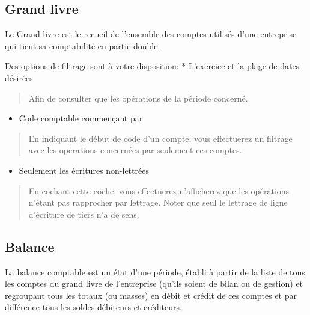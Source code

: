 \documentclass[a4paper,10pt,oneside,french]{sphinxmanual}
\begin{document}
\subsection{Grand livre}
\label{\detokenize{accounting/reporting:grand-livre}}
Le Grand livre est le recueil de l’ensemble des comptes utilisés d’une entreprise qui tient sa comptabilité en partie double.

Des options de filtrage sont à votre disposition:
* L’exercice et la plage de dates désirées
\begin{quote}

Afin de consulter que les opérations de la période concerné.
\end{quote}
\begin{itemize}
\item {} 
Code comptable commençant par

\end{itemize}
\begin{quote}

En indiquant le début de code d’un compte, vous effectuerez un filtrage avec les opérations concernées par seulement ces comptes.
\end{quote}
\begin{itemize}
\item {} 
Seulement les écritures non-lettrées

\end{itemize}
\begin{quote}

En cochant cette coche, vous effectuerez n’afficherez que les opérations n’étant pas rapprocher par lettrage.
Noter que seul le lettrage de ligne d’écriture de tiers n’a de sens.
\end{quote}


\subsection{Balance}
\label{\detokenize{accounting/reporting:balance}}
La balance comptable est un état d’une période, établi à partir de la liste de tous les comptes du grand livre de l’entreprise (qu’ils soient de bilan ou de gestion) et regroupant tous les totaux (ou masses) en débit et crédit de ces comptes et par différence tous les soldes débiteurs et créditeurs.
\end{document}
